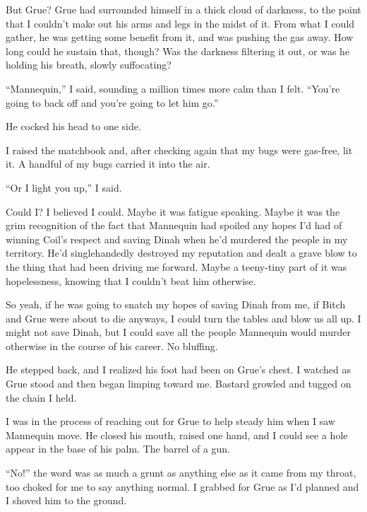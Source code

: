 But Grue?  Grue had surrounded himself in a thick cloud of darkness, to the point that I couldn't make out his arms and legs in the midst of it.  From what I could gather, he was getting some benefit from it, and was pushing the gas away.  How long could he sustain that, though?  Was the darkness filtering it out, or was he holding his breath, slowly suffocating?



``Mannequin,'' I said, sounding a million times more calm than I felt.  ``You're going to back off and you're going to let him go.''



He cocked his head to one side.



I raised the matchbook and, after checking again that my bugs were gas-free, lit it.  A handful of my bugs carried it into the air.



``Or I light you up,'' I said.



Could I?  I believed I could.  Maybe it was fatigue speaking.  Maybe it was the grim recognition of the fact that Mannequin had spoiled any hopes I'd had of winning Coil's respect and saving Dinah when he'd murdered the people in my territory.  He'd singlehandedly destroyed my reputation and dealt a grave blow to the thing that had been driving me forward.  Maybe a teeny-tiny part of it was hopelessness, knowing that I couldn't  beat him otherwise.



So yeah, if he was going to snatch my hopes of saving Dinah from me, if Bitch and Grue were about to die anyways, I could turn the tables and blow us all up.  I might not save Dinah, but I could save all the people Mannequin would murder otherwise in the course of his career.  No bluffing.



He stepped back, and I realized his foot had been on Grue's chest.  I watched as Grue stood and then began limping toward me.  Bastard growled and tugged on the chain I held.



I was in the process of reaching out for Grue to help steady him when I saw Mannequin move.  He closed his mouth, raised one hand, and I could see a hole appear in the base of his palm.  The barrel of a gun.



``No!'' the word was as much a grunt as anything else as it came from my throat, too choked for me to say anything normal.  I grabbed for Grue as I'd planned and I shoved him to the ground.



